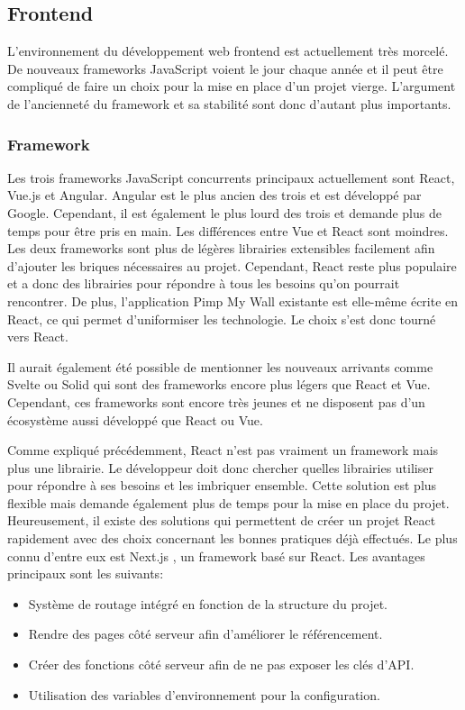 \subsection{Frontend}

L'environnement du développement web frontend est actuellement très morcelé. De nouveaux frameworks JavaScript voient le jour chaque année et il peut être compliqué de faire un choix pour la mise en place d'un projet vierge. L'argument de l'ancienneté du framework et sa stabilité sont donc d'autant plus importants.

\subsubsection{Framework}

Les trois frameworks JavaScript concurrents principaux actuellement sont React, Vue.js et Angular. Angular est le plus ancien des trois et est développé par Google. Cependant, il est également le plus lourd des trois et demande plus de temps pour être pris en main. Les différences entre Vue et React sont moindres. Les deux frameworks sont plus de légères librairies extensibles facilement afin d'ajouter les briques nécessaires au projet. Cependant, React reste plus populaire et a donc des librairies pour répondre à tous les besoins qu'on pourrait rencontrer. De plus, l'application Pimp My Wall existante est elle-même écrite en React, ce qui permet d'uniformiser les technologie. Le choix s'est donc tourné vers React.

Il aurait également été possible de mentionner les nouveaux arrivants comme Svelte ou Solid qui sont des frameworks encore plus légers que React et Vue. Cependant, ces frameworks sont encore très jeunes et ne disposent pas d'un écosystème aussi développé que React ou Vue.

Comme expliqué précédemment, React n'est pas vraiment un framework mais plus une librairie. Le développeur doit donc chercher quelles librairies utiliser pour répondre à ses besoins et les imbriquer ensemble. Cette solution est plus flexible mais demande également plus de temps pour la mise en place du projet. Heureusement, il existe des solutions qui permettent de créer un projet React rapidement avec des choix concernant les bonnes pratiques déjà effectués. Le plus connu d'entre eux est Next.js \cite{nextjs}, un framework basé sur React. Les avantages principaux sont les suivants:

\begin{itemize}
  \item Système de routage intégré en fonction de la structure du projet.
  \item Rendre des pages côté serveur afin d'améliorer le référencement.
  \item Créer des fonctions côté serveur afin de ne pas exposer les clés d'API.
  \item Utilisation des variables d'environnement pour la configuration.
\end{itemize}

